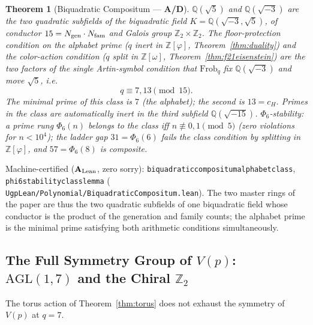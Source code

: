 \documentclass[11pt]{article}
\newtheorem{theorem}{Theorem}[section]
\theoremstyle{remark}
\newcommand{\lean}[1]{%
  \penalty-100
  \begingroup\def\_{\textunderscore\allowbreak}\texttt{#1}\endgroup}
\newcommand{\CatAL}{\texorpdfstring{\ensuremath{\textbf{A}_{\rm Lean}}}{A-Lean}}
\newcommand{\CatAD}{\textbf{A/D}}
\begin{document}
\begin{theorem}[Biquadratic Compositum --- \CatAD{}]
\label{thm:compositum}
$\mathbb{Q}(\sqrt{5})$ and $\mathbb{Q}(\sqrt{-3})$ are the two quadratic
subfields of the biquadratic field $K = \mathbb{Q}(\sqrt{-3}, \sqrt{5})$,
of conductor $15 = N_{\rm gen} \cdot N_{\rm fam}$ and Galois group
$\mathbb{Z}_2 \times \mathbb{Z}_2$. The floor-protection condition on the
alphabet prime ($q$ inert in $\mathbb{Z}[\varphi]$,
Theorem~\ref{thm:duality}) and the color-action condition ($q$ split in
$\mathbb{Z}[\omega]$, Theorem~\ref{thm:f21eisenstein}) are the two factors
of the single Artin-symbol condition that $\mathrm{Frob}_q$ fix
$\mathbb{Q}(\sqrt{-3})$ and move $\sqrt{5}$, i.e.
\[
  q \equiv 7, 13 \pmod{15}.
\]
The minimal prime of this class is $7$ (the alphabet); the second is
$13 = c_H$. Primes in the class are automatically inert in the third
subfield $\mathbb{Q}(\sqrt{-15})$. \emph{$\Phi_6$-stability:} a prime rung
$\Phi_6(n)$ belongs to the class iff $n \not\equiv 0, 1 \pmod 5$ (zero
violations for $n < 10^4$); the ladder gap $31 = \Phi_6(6)$ fails the class
condition by splitting in $\mathbb{Z}[\varphi]$, and $57 = \Phi_6(8)$ is
composite.
\end{theorem}

Machine-certified (\CatAL{}, zero sorry):
\lean{biquadratic\_compositum\_alphabet\_class},
\lean{phi6\_stability\_class\_lemma}
(\lean{UgpLean/Polynomial/BiquadraticCompositum.lean}).
The two master rings of the paper are thus the two quadratic subfields of
one biquadratic field whose conductor is the product of the generation and
family counts; the alphabet prime is the minimal prime satisfying both
arithmetic conditions simultaneously.

\subsection{The Full Symmetry Group of \texorpdfstring{$V(p)$}{V(p)}:
\texorpdfstring{$\mathrm{AGL}(1,7)$}{AGL(1,7)} and the
Chiral \texorpdfstring{$\mathbb{Z}_2$}{Z2}}
\label{subsec:agl17}

The torus action of Theorem~\ref{thm:torus} does not exhaust the symmetry
of $V(p)$ at $q = 7$.
\end{document}
